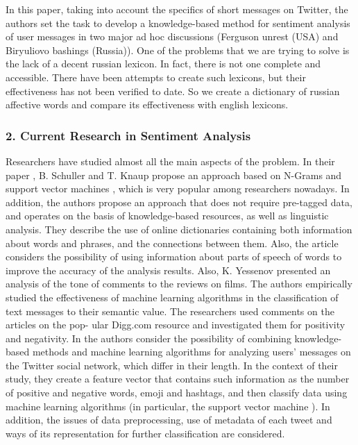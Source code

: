 In this paper, taking into account the specifics of short messages on Twitter, the authors set the task to develop a knowledge-based method for sentiment analysis of user messages in two major ad hoc discussions (Ferguson unrest (USA) and Biryuliovo bashings (Russia)). One of the problems that we are trying to solve is the lack of a decent russian lexicon. In fact, there is not one complete and accessible. There have been attempts to create such lexicons, but their effectiveness has not been verified to date. So we create a dictionary of russian affective words and compare its effectiveness with english lexicons.

\subsubsection{2. Current Research in Sentiment Analysis}

Researchers have studied almost all the main aspects of the problem. In their paper \cite{SchullerKnaup}, B. Schuller and T. Knaup propose an approach based on N-Grams and support vector machines \cite{ScholkopfCristianini}, which is very popular among researchers nowadays. In addition, the authors propose an approach that does not require pre-tagged data, and operates on the basis of knowledge-based resources, as well as linguistic analysis. They describe the use of online dictionaries containing both information about words and phrases, and the connections between them. Also, the article considers the possibility of using information about parts of speech of words to improve the accuracy of the analysis results. Also, K. Yessenov \cite{MisailovicYessenov} presented an analysis of the tone of comments to the reviews on films. The authors empirically studied the effectiveness of machine learning algorithms in the classification of text messages to their semantic value. The researchers used comments on the articles on the pop- ular Digg.com resource and investigated them for positivity and negativity. In \cite{RavindranSuchdevKotkar} the authors consider the possibility of combining knowledge-based methods and machine learning algorithms for analyzing users’ messages on the Twitter social network, which differ in their length. In the context of their study, they create a feature vector that contains such information as the number of positive and negative words, emoji and hashtags, and then classify data using machine learning algorithms (in particular, the support vector machine \cite{ScholkopfCristianini}). In addition, the issues of data preprocessing, use of metadata of each tweet and ways of its representation for further classification are considered.

